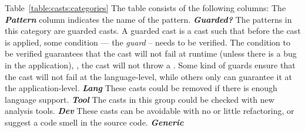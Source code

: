 \newcommand{\gh}[1]{\emph{\textbf{#1}}}
Table~\ref{table:casts:categories} 
The table consists of the following columns: The \gh{Pattern} column indicates the name of the pattern.
\gh{Guarded?} The patterns in this category are guarded casts.
A guarded cast is a cast such that before the cast is applied,
some condition --- the \emph{guard} -- needs to be verified.
The condition to be verified guarantees that the cast will not fail at runtime (unless there is a bug in the application), \ie,
the cast will not throw a .
Some kind of guards ensure that the cast will not fail at the language-level,
while others only can guarantee it at the application-level.
\gh{Lang} These casts could be removed if there is enough language support.
\gh{Tool} The casts in this group could be checked with new analysis tools.
\gh{Dev} These casts can be avoidable with no or little refactoring,
or suggest a code smell in the source code.
\gh{Generic}

